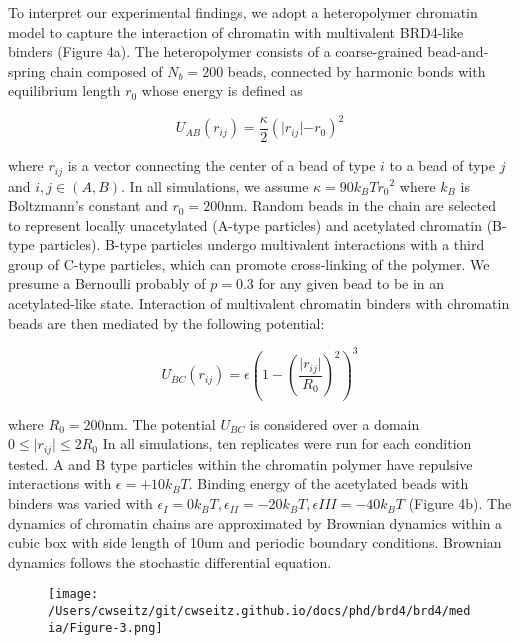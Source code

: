 To interpret our experimental findings, we adopt a heteropolymer chromatin model to capture the interaction of chromatin with multivalent BRD4-like binders (Figure 4a). The heteropolymer consists of a coarse-grained bead-and-spring chain composed of $N_b=200$ beads, connected by harmonic bonds with equilibrium length $r_0$ whose energy is deﬁned as

\begin{equation*}
U_{AB}(r_{ij})=\frac{\kappa}{2}(\lvert r_{ij}\lvert-r_0)^2
\end{equation*}

where $r_{ij}$ is a vector connecting the center of a bead of type $i$ to a bead of type $j$ and $i,j \in (A,B)$. In all simulations, we assume $\kappa=90k_{B}T{r_0}^2$ where $k_{B}$ is Boltzmann’s constant and $r_0=200$nm. Random beads in the chain are selected to represent locally unacetylated (A-type particles) and acetylated chromatin (B-type particles).  B-type particles undergo multivalent interactions with a third group of C-type particles, which can promote cross-linking of the polymer. We presume a Bernoulli probably of $p=0.3$ for any given bead to be in an acetylated-like state. Interaction of multivalent chromatin binders with chromatin beads are then mediated by the following potential:

\begin{equation*}
U_{BC}\left(r_{ij}\right)=\epsilon\left(1-\left(\frac{\lvert r_{ij}\lvert}{R_0}\right)^2\right)^3
\end{equation*}

where $R_0=200$nm. The potential $U_{BC}$ is considered over a domain $0\leq\lvert r_{ij}\lvert\leq 2 R_0$ In all simulations, ten replicates were run for each condition tested. A and B type particles within the chromatin polymer have repulsive interactions with $\epsilon = +10k_{B}T$. Binding energy of the acetylated beads with binders was varied with $\epsilon_{I} = 0 k_{B}T,\epsilon_{II} = -20k_{B}T,\epsilon{III}=-40k_{B}T$ (Figure 4b). The dynamics of chromatin chains are approximated by Brownian dynamics within a cubic box with side length of 10um and periodic boundary conditions. Brownian dynamics follows the stochastic differential equation.

\begin{figure}[t]
\texttt{[image: /Users/cwseitz/git/cwseitz.github.io/docs/phd/brd4/brd4/media/Figure-3.png]}
\caption{}
\end{figure}

